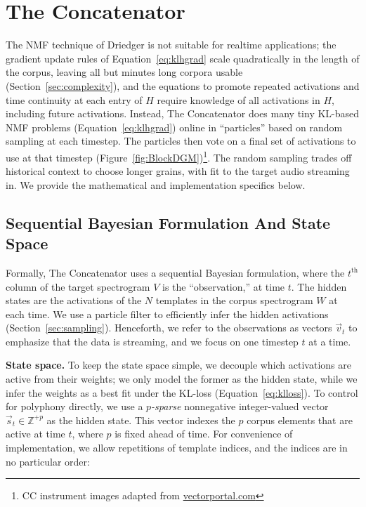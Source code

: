 \documentclass{article}
\begin{document}
\section{The Concatenator}



The NMF technique of Driedger is not suitable for realtime applications; the gradient update rules of Equation~\ref{eq:klhgrad} scale quadratically in the length of the corpus, leaving all but minutes long corpora usable (Section~\ref{sec:complexity}), and the equations to promote repeated activations and time continuity at each entry of $H$ require knowledge of all activations in $H$, including future activations.  Instead, The Concatenator does many tiny KL-based NMF problems (Equation~\ref{eq:klhgrad}) online in ``particles'' based on random sampling at each timestep.  The particles then vote on a final set of activations to use at that timestep (Figure~\ref{fig:BlockDGM})\footnote{CC instrument images adapted from \url{vectorportal.com}}.  The random sampling trades off historical context to choose longer grains, with fit to the target audio streaming in.  We provide the mathematical and implementation specifics below.

\subsection{Sequential Bayesian Formulation And State Space}
\label{sec:bayesian}

    Formally, The Concatenator uses a sequential Bayesian formulation, where the $t^{\text{th}}$ column of the target spectrogram $V$ is the ``observation,'' at time $t$.  The hidden states are the activations of the $N$ templates in the corpus spectrogram $W$ at each time.  We use a particle filter to efficiently infer the hidden activations (Section~\ref{sec:sampling}). Henceforth, we refer to the observations as vectors $\vec{v}_t$ to emphasize that the data is streaming, and we focus on one timestep $t$ at a time.  
    
    \textbf{State space.} To keep the state space simple, we decouple which activations are active from their weights; we only model the former as the hidden state, while we infer the weights as a best fit under the KL-loss (Equation~\ref{eq:klloss}).  To control for polyphony directly, we use a {\em $p$-sparse} nonnegative integer-valued vector $\vec{s}_t \in \mathbb{Z}^{+p}$ as the hidden state.  This vector indexes the $p$ corpus elements that are active at time $t$, where $p$ is fixed ahead of time.  For convenience of implementation, we allow repetitions of template indices, and the indices are in no particular order:%
\end{document}
